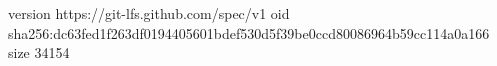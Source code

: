 version https://git-lfs.github.com/spec/v1
oid sha256:dc63fed1f263df0194405601bdef530d5f39be0ccd80086964b59cc114a0a166
size 34154
